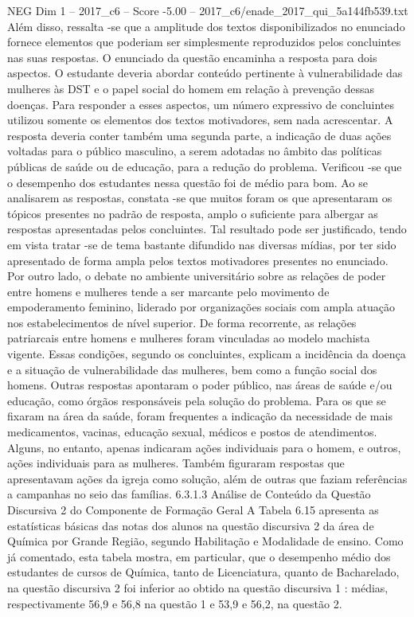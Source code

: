 \begin{textsample}{NEG Dim 1 – 2017\_c6 – Score -5.00 – 2017\_c6/enade\_2017\_qui\_5a144fb539.txt}
Além disso, ressalta -se que a amplitude dos textos disponibilizados no enunciado fornece elementos que poderiam ser simplesmente reproduzidos pelos concluintes nas suas respostas.
O enunciado da questão encaminha a resposta para dois aspectos.
O estudante deveria abordar conteúdo pertinente à vulnerabilidade das mulheres às DST e o papel social do homem em relação à prevenção dessas doenças.
Para responder a esses aspectos, um número expressivo de concluintes utilizou somente os elementos dos textos motivadores, sem nada acrescentar.
A resposta deveria conter também uma segunda parte, a indicação de duas ações voltadas para o público masculino, a serem adotadas no âmbito das políticas públicas de saúde ou de educação, para a redução do problema.
Verificou -se que o desempenho dos estudantes nessa questão foi de médio para bom.
Ao se analisarem as respostas, constata -se que muitos foram os que apresentaram os tópicos presentes no padrão de resposta, amplo o suficiente para albergar as respostas apresentadas pelos concluintes.
Tal resultado pode ser justificado, tendo em vista tratar -se de tema bastante difundido nas diversas mídias, por ter sido apresentado de forma ampla pelos textos motivadores presentes no enunciado.
Por outro lado, o debate no ambiente universitário sobre as relações de poder entre homens e mulheres tende a ser marcante pelo movimento de empoderamento feminino, liderado por organizações sociais com ampla atuação nos estabelecimentos de nível superior.
De forma recorrente, as relações patriarcais entre homens e mulheres foram vinculadas ao modelo machista vigente.
Essas condições, segundo os concluintes, explicam a incidência da doença e a situação de vulnerabilidade das mulheres, bem como a função social dos homens.
Outras respostas apontaram o poder público, nas áreas de saúde e/ou educação, como órgãos responsáveis pela solução do problema.
Para os que se fixaram na área da saúde, foram frequentes a indicação da necessidade de mais medicamentos, vacinas, educação sexual, médicos e postos de atendimentos.
Alguns, no entanto, apenas indicaram ações individuais para o homem, e outros, ações individuais para as mulheres.
Também figuraram respostas que apresentavam ações da igreja como solução, além de outras que faziam referências a campanhas no seio das famílias. 6.3.1.3 Análise de Conteúdo da Questão Discursiva 2 do Componente de Formação Geral A Tabela 6.15 apresenta as estatísticas básicas das notas dos alunos na questão discursiva 2 da área de Química por Grande Região, segundo Habilitação e Modalidade de ensino.
Como já comentado, esta tabela mostra, em particular, que o desempenho médio dos estudantes de cursos de Química, tanto de Licenciatura, quanto de Bacharelado, na questão discursiva 2 foi inferior ao obtido na questão discursiva 1 : médias, respectivamente 56,9 e 56,8 na questão 1 e 53,9 e 56,2, na questão 2.

\end{textsample}
